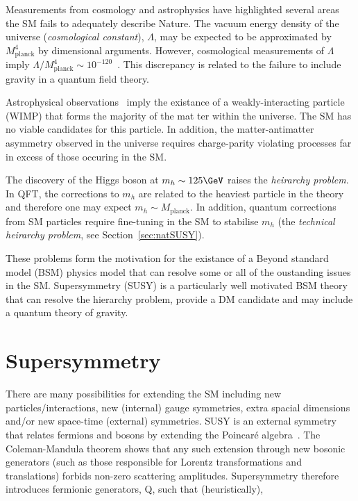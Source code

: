 Measurements from cosmology and astrophysics have highlighted several areas
the SM fails to adequately describe Nature. The vacuum energy density 
of the universe (\emph{cosmological constant}), $\Lambda$, 
may be expected to be approximated by $M^4_{\text{planck}}$ by dimensional 
arguments. However, cosmological measurements of $\Lambda$ imply 
$\Lambda/M_{\text{planck}}^4 \sim 10^{-120}$~\cite{cosConst}. This discrepancy
is related to the failure to include gravity in a quantum field theory.

Astrophysical observations~\cite{WIMP} imply the existance 
of a weakly-interacting particle (WIMP) that forms the majority of the mat
ter within the universe. The SM has no viable candidates for 
this particle. In addition, the matter-antimatter asymmetry observed in the universe requires 
charge-parity violating processes far in excess of those occuring in the SM.

The discovery of the Higgs boson at $m_{h}\sim125\GeV$ raises the \emph{heirarchy problem}. In QFT, 
the corrections to $m_h$ are related to the heaviest particle in the theory and therefore
one may expect $m_h \sim M_{\text{planck}}$. In addition, quantum corrections from SM particles
require fine-tuning in the SM to stabilise $m_h$ (the \emph{technical heirarchy problem}, see Section~\ref{sec:natSUSY}).

These problems form the motivation for the existance of a Beyond standard model (BSM) physics model that
can resolve some or all of the oustanding issues in the SM. Supersymmetry (SUSY) is a particularly
well motivated BSM theory that can resolve the hierarchy problem, provide a DM candidate
and may include a quantum theory of gravity.

\section{Supersymmetry}

There are many possibilities for extending the SM including new particles/interactions, new (internal) gauge symmetries, 
extra spacial dimensions and/or new space-time (external) symmetries. SUSY is 
an external symmetry that relates fermions and bosons by extending the Poincar\'{e} algebra~\cite{SUSYC}. 
The Coleman-Mandula theorem shows that any such extension through new bosonic generators (such as those responsible for Lorentz 
transformations and translations) forbids non-zero scattering amplitudes. 
Supersymmetry therefore introduces fermionic generators, Q, such that (heuristically),

